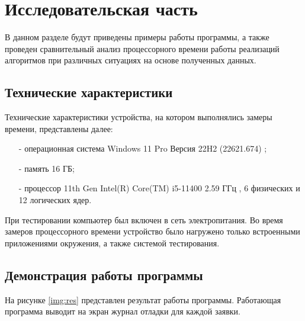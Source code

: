 \chapter{Исследовательская часть}

В данном разделе будут приведены примеры работы программы, а также проведен сравнительный анализ процессорного времени работы реализаций алгоритмов при различных ситуациях на основе полученных данных.

\section{Технические характеристики}

Технические характеристики устройства, на котором выполнялись замеры времени, представлены далее:

\begin{itemize}[itemindent=1em]
	\item[-] операционная система Windows 11 Pro Версия 22H2 (22621.674) \cite{wind};
	\item[-] память 16 ГБ;
	\item[-] процессор 11th Gen Intel(R) Core(TM) i5-11400 2.59 ГГц \cite{proc}, 6 физических и 12 логических ядер.
\end{itemize}

При тестировании компьютер был включен в сеть электропитания. Во время замеров процессорного времени устройство было нагружено только встроенными приложениями окружения, а также системой тестирования.

\section{Демонстрация работы программы}

На рисунке \ref{img:res} представлен результат работы программы. Работающая программа выводит на экран журнал отладки для каждой заявки.
\begin{center}
	\label{img:res}
\end{center}

